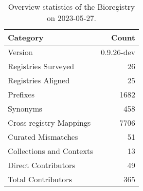 \begin{table}
\caption{Overview statistics of the Bioregistry on 2023-05-27.}
\label{tab:bioregistry-summary}
\begin{tabular}{lr}
\toprule
Category & Count \\
\midrule
Version & 0.9.26-dev \\
Registries Surveyed & 26 \\
Registries Aligned & 25 \\
Prefixes & 1682 \\
Synonyms & 458 \\
Cross-registry Mappings & 7706 \\
Curated Mismatches & 51 \\
Collections and Contexts & 13 \\
Direct Contributors & 49 \\
Total Contributors & 365 \\
\bottomrule
\end{tabular}
\end{table}
